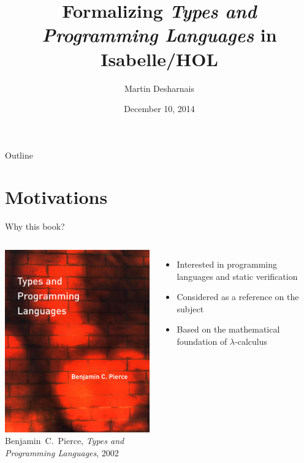 \documentclass{beamer}
\title[Formalizing \emph{TAPL} in Isabelle/HOL]
{Formalizing \emph{Types and Programming Languages} in Isabelle/HOL}
\author{Martin Desharnais}
\institute[ÉTS]{École de technologie supérieure}
\date{December 10, 2014}
\begin{document}
\begin{frame}
  \titlepage
\end{frame}

\begin{frame}{Outline}
  \tableofcontents
\end{frame}

\section{Motivations}

\begin{frame}{Why this book?}
  \begin{columns}[c]
    \includegraphics[scale=0.5]{TAPL.jpg} \\
    \small{Benjamin~C.~Pierce, \emph{Types and Programming Languages}, 2002}
    \begin{itemize}
      \item Interested in programming languages and static verification
      \item Considered as a reference on the subject
      \item Based on the mathematical foundation of $\lambda$-calculus
    \end{itemize}
  \end{columns}
\end{frame}
\end{document}
